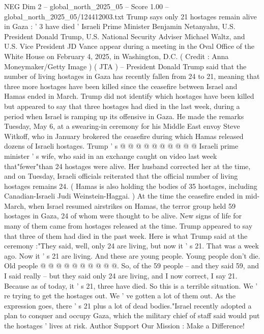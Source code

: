 \begin{textsample}{NEG Dim 2 – global\_north\_2025\_05 – Score 1.00 – global\_north\_2025\_05/124412003.txt}  \label{ex:f2_neg_238}
Trump says only 21 hostages remain alive in Gaza : ' 3 have died ' Israeli Prime Minister Benjamin Netanyahu, U.S.
President Donald Trump, U.S.
National Security Adviser Michael Waltz, and U.S.
Vice President JD Vance appear during a meeting in the Oval Office of the White House on February 4, 2025, in Washington, D.C. ( Credit : Anna Moneymaker/Getty Image ) ( JTA ) -- President Donald Trump said that the number of living hostages in Gaza has recently fallen from 24 to 21, meaning that three more hostages have been killed since the ceasefire between Israel and Hamas ended in March.
Trump did not identify which hostages have been killed but appeared to say that three hostages had died in the last week, during a period when Israel is ramping up its offensive in Gaza.
He made the remarks Tuesday, May 6, at a swearing-in ceremony for his Middle East envoy Steve Witkoff, who in January brokered the ceasefire during which Hamas released dozens of Israeli hostages.
Trump ' s @ @ @ @ @ @ @ @ @ @ Israeli prime minister ' s wife, who said in an exchange caught on video last week that"fewer"than 24 hostages were alive.
Her husband corrected her at the time, and on Tuesday, Israeli officials reiterated that the official number of living hostages remains 24. ( Hamas is also holding the bodies of 35 hostages, including Canadian-Israeli Judi Weinstein-Haggai. ) At the time the ceasefire ended in mid-March, when Israel resumed airstrikes on Hamas, the terror group held 59 hostages in Gaza, 24 of whom were thought to be alive.
New signs of life for many of them came from hostages released at the time.
Trump appeared to say that three of them had died in the past week.
Here is what Trump said at the ceremony :"They said, well, only 24 are living, but now it ' s 21.
That was a week ago.
Now it ' s 21 are living.
And these are young people.
Young people don't die.
Old people @ @ @ @ @ @ @ @ @ @.
So, of the 59 people -- and they said 59, and I said really -- but they said only 24 are living, and I now correct, I say 21.
Because as of today, it ' s 21, three have died.
So this is a terrible situation.
We ' re trying to get the hostages out.
We ' ve gotten a lot of them out.
As the expression goes, there ' s 21 plus a lot of dead bodies."Israel recently adopted a plan to conquer and occupy Gaza, which the military chief of staff said would put the hostages ' lives at risk.
Author Support Our Mission : Make a Difference!

\end{textsample}
